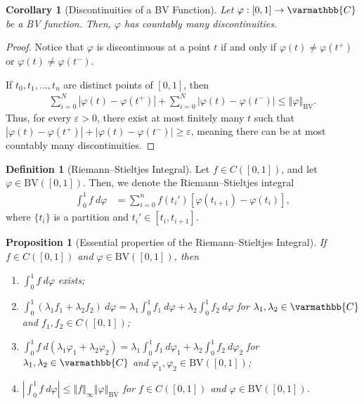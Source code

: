 \documentclass[10pt]{extarticle}
\newcommand{\C}{\mathbb{C}}
\newcommand{\norm}[1]{\left\Vert #1\right\Vert}
\newcommand{\ve}{\varepsilon}
\theoremstyle{plain}
\newtheorem*{corollary}{Corollary}
\newtheorem*{proposition}{Proposition}
\theoremstyle{definition}
\newtheorem*{definition}{Definition}
\theoremstyle{note}
\renewcommand*{\mathbb}[1]{\varmathbb{#1}}
\renewcommand{\newline}{\hfill\break}
\begin{document}
\begin{corollary}[Discontinuities of a BV Function]
  Let $\varphi: [0,1]\rightarrow \C$ be a BV function. Then, $\varphi$ has countably many discontinuities.
\end{corollary}
\begin{proof}
  Notice that $\varphi$ is discontinuous at a point $t$ if and only if $\varphi(t) \neq \varphi\left(t^{+}\right)$ or $\varphi(t) \neq \varphi\left(t^{-}\right)$.\newline

  If $t_0,t_1,\dots,t_n$ are distinct points of $[0,1]$, then
  \begin{align*}
    \sum_{i=0}^{N}\left\vert \varphi(t) - \varphi(t^{+}) \right\vert + \sum_{i=0}^{N}\left\vert \varphi(t) - \varphi(t^{-}) \right\vert \leq \norm{\varphi}_{\text{BV}}.
  \end{align*}
  Thus, for every $\ve > 0$, there exist at most finitely many $t$ such that $\left\vert \varphi(t) - \varphi\left(t^{+}\right) \right\vert + \left\vert \varphi(t) - \varphi(t^{-}) \right\vert \geq \ve$, meaning there can be at most countably many discontinuities.
\end{proof}
\begin{definition}[Riemann--Stieltjes Integral]
  Let $f\in C([0,1])$, and let $\varphi \in \text{BV}\left([0,1]\right)$. Then, we denote the Riemann--Stieltjes integral
  \begin{align*}
    \int_{0}^{1}f\:d\varphi &= \sum_{i=0}^{n}f\left(t_i'\right)\left[\varphi\left(t_{i+1}\right) - \varphi\left(t_i\right)\right],
  \end{align*}
  where $\{t_i\}$ is a partition and $t_i'\in [t_i,t_{i+1}]$.
\end{definition}
\begin{proposition}[Essential properties of the Riemann--Stieltjes Integral]
  If $f\in C([0,1])$ and $\varphi\in \text{BV}\left([0,1]\right)$, then
  \begin{enumerate}[(1)]
    \item $\displaystyle \int_{0}^{1} f\:d\varphi$ exists;
    \item $\displaystyle \int_{0}^{1} \left(\lambda_1f_1 + \lambda_2f_2\right)\:d\varphi = \lambda_1 \int_{0}^{1} f_1\:d\varphi + \lambda_2 \int_{0}^{1} f_2\:d\varphi$ for $\lambda_1,\lambda_2\in \C$ and $f_1,f_2 \in C([0,1])$;
    \item $\displaystyle \int_{0}^{1} f\:d\left(\lambda_1\varphi_1 + \lambda_2\varphi_2\right) = \lambda_1\int_{0}^{1} f_1\:d\varphi_1 + \lambda_2 \int_{0}^{1} f_2\:d\varphi_2$ for $\lambda_1,\lambda_2\in \C$ and $\varphi_1,\varphi_2\in \text{BV}\left([0,1]\right)$;
    \item $\displaystyle \left\vert \int_{0}^{1} f\:d\varphi \right\vert \leq \norm{f}_{\infty}\norm{\varphi}_{\text{BV}}$ for $f\in C\left([0,1]\right)$ and $\varphi \in \text{BV}\left([0,1]\right)$.
  \end{enumerate}
\end{proposition}
\end{document}
